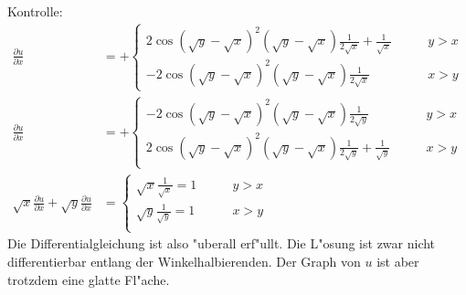 \begin{loesung}
Kontrolle:
\begin{align*}
\frac{\partial u}{\partial x}
&=
+\begin{cases}
2\cos(\sqrt{y}-\sqrt{x})^2(\sqrt{y}-\sqrt{x})\frac1{2\sqrt{x}}
+\frac1{\sqrt{x}}&\qquad y> x\\
-2\cos(\sqrt{y}-\sqrt{x})^2(\sqrt{y}-\sqrt{x})\frac1{2\sqrt{x}}
&\qquad x> y
\end{cases}
\\
\frac{\partial u}{\partial x}
&=
+\begin{cases}
-2\cos(\sqrt{y}-\sqrt{x})^2(\sqrt{y}-\sqrt{x})\frac1{2\sqrt{y}}
&\qquad y> x\\
2\cos(\sqrt{y}-\sqrt{x})^2(\sqrt{y}-\sqrt{x})\frac1{2\sqrt{y}}
+\frac1{\sqrt{y}}&\qquad x> y\\
\end{cases}
\\
\sqrt{x}
\frac{\partial u}{\partial x}
+
\sqrt{y}
\frac{\partial u}{\partial x}
&=
\begin{cases}
\sqrt{x}\frac1{\sqrt{x}}=1&\qquad y> x\\
\sqrt{y}\frac1{\sqrt{y}}=1&\qquad x> y\\
\end{cases}
\end{align*}
Die Differentialgleichung ist also "uberall erf"ullt. Die L"osung ist
zwar nicht differentierbar entlang der
Winkelhalbierenden. Der Graph von $u$ ist aber trotzdem eine
glatte Fl"ache.
\end{loesung}
